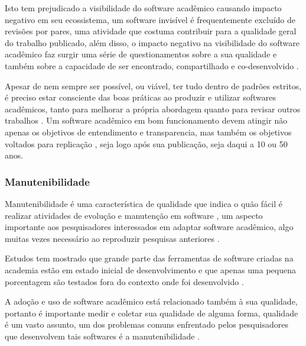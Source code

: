 Isto tem prejudicado a visibilidade do software acadêmico causando impacto
negativo em seu ecossistema, um software invisível é frequentemente excluído de
revisões por pares, uma atividade que costuma contribuir para a qualidade geral
do trabalho publicado, além disso, o
impacto negativo na visibilidade do software acadêmico faz surgir uma
série de questionamentos sobre a sua qualidade e também sobre a
capacidade de ser encontrado, compartilhado e co-desenvolvido
\cite{howison2013incentives, katz2014transitive} \cite{howison2016software}.

Apesar de nem sempre ser possível, ou viável, ter tudo dentro de padrões
estritos, é preciso estar consciente das boas práticas ao produzir e utilizar
softwares acadêmicos, tanto para melhorar a própria abordagem quanto para
revisar outros trabalhos \cite{wilson2014best}. Um software acadêmico em bom
funcionamento devem atingir não apenas os objetivos de entendimento e
transparencia, mas também os objetivos voltados para replicação
\cite{stodden2010reproducible}, seja logo após sua publicação, seja daqui a 10 ou 50 anos.

\subsubsection{Manutenibilidade}


Manutenibilidade é uma característica de qualidade que indica o quão fácil é
realizar atividades de evolução e manutenção em software
\cite{kumar2012survey}, um aspecto importante aos pesquisadores interessados em
adaptar software acadêmico, algo muitas vezes necessário ao reproduzir
pesquisas anteriores \cite{peng2011reproducible}.

Estudos tem mostrado que grande parte das ferramentas de software criadas na
academia estão em estado inicial de desenvolvimento \cite{marshall2013tools} e
que apenas uma pequena porcentagem são testados fora do contexto onde foi
desenvolvido \cite{portillo2012tools}.

A adoção e uso de software acadêmico está relacionado também à sua qualidade,
portanto é importante medir e coletar sua qualidade de alguma forma, qualidade
é um vasto assunto, um dos problemas comuns enfrentado pelos pesquisadores que
desenvolvem tais softwares é a manutenibilidade \cite{prlic2012ten}.


